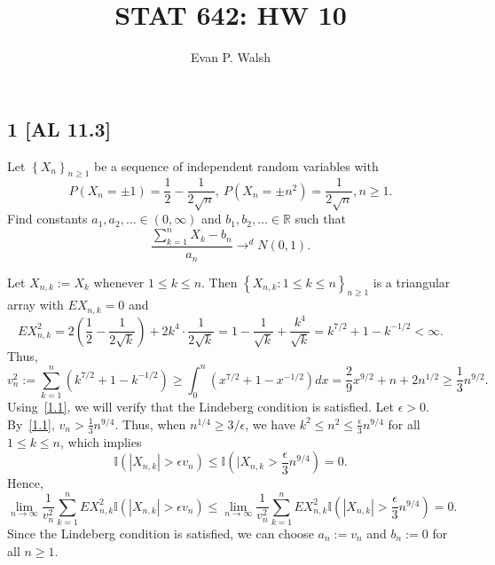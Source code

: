 \documentclass[12pt]{article}
\title{STAT 642: HW 10}
\author{Evan P. Walsh}
\begin{document}
\maketitle

\subsection*{1 [AL 11.3]}
\begin{tcolorbox}
  Let $\left\{ X_n \right\}_{n\geq 1}$ be a sequence of independent random variables with 
  \[ 
    P(X_n = \pm 1) = \frac{1}{2} - \frac{1}{2\sqrt{n}},\ P(X_n = \pm n^{2}) = \frac{1}{2\sqrt{n}}, n \geq 1. 
  \]
  Find constants $a_1, a_2, \hdots \in (0,\infty)$ and $b_1, b_2, \hdots \in \mathbb{R}$ such that 
  \[
    \frac{\sum_{k=1}^{n}X_k - b_n}{a_n} \rightarrow^{d} N(0,1).
  \]
\end{tcolorbox}
Let $X_{n,k} := X_k$ whenever $1 \leq k \leq n$. Then $\left\{ X_{n,k} : 1\leq k \leq n \right\}_{n\geq 1}$ is a triangular array with $EX_{n,k} = 0$
and 
\[
  EX_{n,k}^{2} = 2\left( \frac{1}{2} - \frac{1}{2\sqrt{k}} \right) + 2k^{4}\cdot \frac{1}{2\sqrt{k}} = 1 - \frac{1}{\sqrt{k}} + \frac{k^{4}}{\sqrt{k}} = k^{7/2} + 1 - k^{-1/2} < \infty.
\]
Thus,
\begin{equation}
  v_{n}^{2} := \sum_{k=1}^{n}(k^{7/2} + 1 - k^{-1/2}) \geq \int_{0}^{n}(x^{7/2} + 1 - x^{-1/2})dx = \frac{2}{9}x^{9/2} + n + 2n^{1/2} \geq
  \frac{1}{3}n^{9/2}.
  \label{1.1}
\end{equation}
Using~\eqref{1.1}, we will verify that the Lindeberg condition is satisfied. Let $\epsilon > 0$. By~\eqref{1.1}, $v_n > \frac{1}{3}n^{9/4}$.
Thus, when $n^{1/4} \geq 3 / \epsilon$, we have $k^{2} \leq
n^{2} \leq \frac{\epsilon}{3}n^{9/4}$ for all $1 \leq k \leq n$, which implies 
\[
  \mathbb{I}\left(|X_{n,k}| > \epsilon v_{n}\right) \leq \mathbb{I}\left(|X_{n,k} > \frac{\epsilon}{3}n^{9/4} \right) = 0.
\]
Hence,
\[ 
  \lim_{n\rightarrow\infty}\frac{1}{v_{n}^{2}}\sum_{k=1}^{n}EX_{n,k}^{2}\mathbb{I}\left( |X_{n,k}| > \epsilon v_{n} \right) \leq
  \lim_{n\rightarrow\infty}\frac{1}{v_{n}^{2}}\sum_{k=1}^{n}EX_{n,k}^{2}\mathbb{I}\left( |X_{n,k}| > \frac{\epsilon}{3}n^{9/4} \right) = 0.
\]
Since the Lindeberg condition is satisfied, we can choose $a_n := v_n$ and $b_n := 0$ for all $n \geq 1$.
\end{document}
